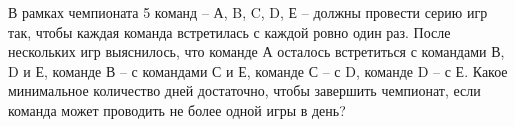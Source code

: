 \question
В рамках чемпионата 5 команд – А, B, C, D, Е – должны провести
серию игр так, чтобы каждая команда встретилась с каждой ровно один раз. После нескольких игр выяснилось, что команде А осталось встретиться с командами В, D и Е, команде В – с командами С и Е, команде С – с D, команде D – с Е. Какое минимальное количество дней достаточно, чтобы завершить чемпионат, если команда может проводить не более одной игры в день?
